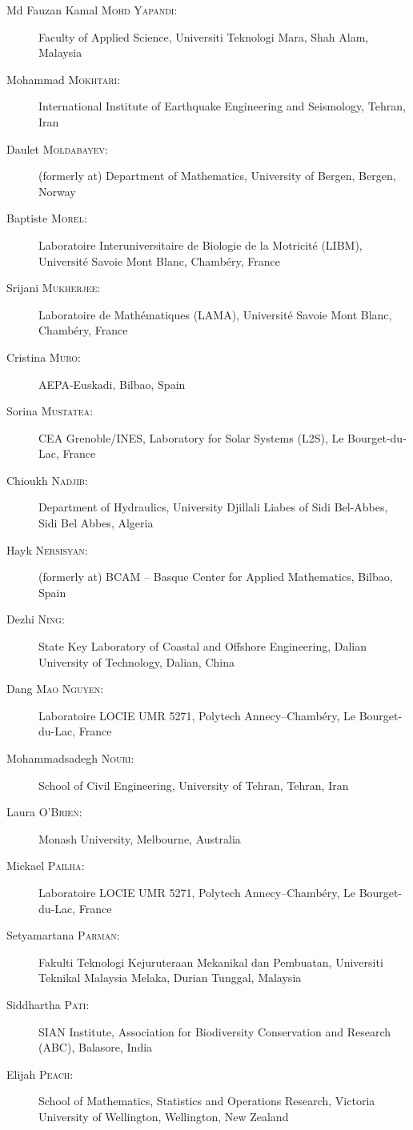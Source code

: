 \begin{description}
  \item[Md Fauzan Kamal \textsc{Mohd Yapandi}:] Faculty of Applied Science, Universiti Teknologi Mara, Shah Alam, Malaysia
  \item[Mohammad \textsc{Mokhtari}:] International Institute of Earthquake Engineering and Seismology, Tehran, Iran
  \item[Daulet \textsc{Moldabayev}:] (formerly at) Department of Mathematics, University of Bergen, Bergen, Norway
  \item[Baptiste \textsc{Morel}:] Laboratoire Interuniversitaire de Biologie de la Motricit\'e (LIBM), Universit\'e Savoie Mont Blanc, Chamb\'ery, France
  \item[Srijani \textsc{Mukherjee}:] Laboratoire de Math\'ematiques (LAMA), Universit\'e Savoie Mont Blanc, Chamb\'ery, France
  \item[Cristina \textsc{Muro}:] AEPA-Euskadi, Bilbao, Spain
  \item[Sorina \textsc{Mustatea}:] CEA Grenoble/INES, Laboratory for Solar Systems (L2S), Le Bourget-du-Lac, France
  \item[Chioukh \textsc{Nadjib}:] Department of Hydraulics, University Djillali Liabes of Sidi Bel-Abbes, Sidi Bel Abbes, Algeria
  \item[Hayk \textsc{Nersisyan}:] (formerly at) BCAM -- Basque Center for Applied Mathematics, Bilbao, Spain
  \item[Dezhi \textsc{Ning}:] State Key Laboratory of Coastal and Offshore Engineering, Dalian University of Technology, Dalian, China
  \item[Dang \textsc{Mao Nguyen}:] Laboratoire LOCIE UMR 5271, Polytech Annecy--Chamb\'ery, Le Bourget-du-Lac, France
  \item[Mohammadsadegh \textsc{Nouri}:] School of Civil Engineering, University of Tehran, Tehran, Iran
  \item[Laura \textsc{O'Brien}:] Monash University, Melbourne, Australia
  \item[Mickael \textsc{Pailha}:] Laboratoire LOCIE UMR 5271, Polytech Annecy--Chamb\'ery, Le Bourget-du-Lac, France
  \item[Setyamartana \textsc{Parman}:] Fakulti Teknologi Kejuruteraan Mekanikal dan Pembuatan, Universiti Teknikal Malaysia Melaka, Durian Tunggal, Malaysia
  \item[Siddhartha \textsc{Pati}:] SIAN Institute, Association for Biodiversity Conservation and Research (ABC), Balasore, India
  \item[Elijah \textsc{Peach}:] School of Mathematics, Statistics and Operations Research, Victoria University of Wellington, Wellington, New Zealand

\end{description}
